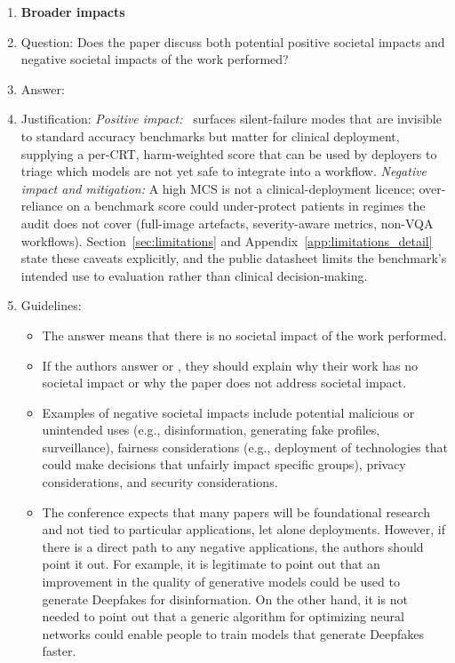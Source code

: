 \begin{enumerate}
\item {\bf Broader impacts}
    \item[] Question: Does the paper discuss both potential positive societal impacts and negative societal impacts of the work performed?
    \item[] Answer: \answerYes{}
    \item[] Justification: \emph{Positive impact:} \medvigil\ surfaces silent-failure modes that are invisible to standard accuracy benchmarks but matter for clinical deployment, supplying a per-CRT, harm-weighted score that can be used by deployers to triage which models are not yet safe to integrate into a workflow. \emph{Negative impact and mitigation:} A high MCS is not a clinical-deployment licence; over-reliance on a benchmark score could under-protect patients in regimes the audit does not cover (full-image artefacts, severity-aware metrics, non-VQA workflows). Section~\ref{sec:limitations} and Appendix~\ref{app:limitations_detail} state these caveats explicitly, and the public datasheet limits the benchmark's intended use to evaluation rather than clinical decision-making.
    \item[] Guidelines:
    \begin{itemize}
        \item The answer \answerNA{} means that there is no societal impact of the work performed.
        \item If the authors answer \answerNA{} or \answerNo, they should explain why their work has no societal impact or why the paper does not address societal impact.
        \item Examples of negative societal impacts include potential malicious or unintended uses (e.g., disinformation, generating fake profiles, surveillance), fairness considerations (e.g., deployment of technologies that could make decisions that unfairly impact specific groups), privacy considerations, and security considerations.
        \item The conference expects that many papers will be foundational research and not tied to particular applications, let alone deployments. However, if there is a direct path to any negative applications, the authors should point it out. For example, it is legitimate to point out that an improvement in the quality of generative models could be used to generate Deepfakes for disinformation. On the other hand, it is not needed to point out that a generic algorithm for optimizing neural networks could enable people to train models that generate Deepfakes faster.

\end{itemize}
\end{enumerate}
